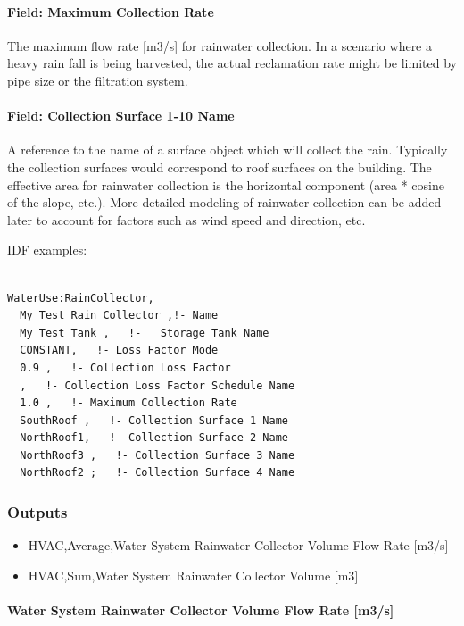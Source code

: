 \paragraph{Field: Maximum Collection Rate}\label{field-maximum-collection-rate}

The maximum flow rate {[}m3/s{]} for rainwater collection. In a scenario where a heavy rain fall is being harvested, the actual reclamation rate might be limited by pipe size or the filtration system.

\paragraph{Field: Collection Surface 1-10 Name}\label{field-collection-surface-1-10-name}

A reference to the name of a surface object which will collect the rain. Typically the collection surfaces would correspond to roof surfaces on the building. The effective area for rainwater collection is the horizontal component (area * cosine of the slope, etc.). More detailed modeling of rainwater collection can be added later to account for factors such as wind speed and direction, etc.

IDF examples:

\begin{lstlisting}

WaterUse:RainCollector,
  My Test Rain Collector ,!- Name
  My Test Tank ,   !-   Storage Tank Name
  CONSTANT,   !- Loss Factor Mode
  0.9 ,   !- Collection Loss Factor
  ,   !- Collection Loss Factor Schedule Name
  1.0 ,   !- Maximum Collection Rate
  SouthRoof ,   !- Collection Surface 1 Name
  NorthRoof1,   !- Collection Surface 2 Name
  NorthRoof3 ,   !- Collection Surface 3 Name
  NorthRoof2 ;   !- Collection Surface 4 Name
\end{lstlisting}

\subsubsection{Outputs}\label{outputs-3-023}

\begin{itemize}
\item
  HVAC,Average,Water System Rainwater Collector Volume Flow Rate {[}m3/s{]}
\item
  HVAC,Sum,Water System Rainwater Collector Volume {[}m3{]}
\end{itemize}

\paragraph{Water System Rainwater Collector Volume Flow Rate {[}m3/s{]}}\label{water-system-rainwater-collector-volume-flow-rate-m3s}

